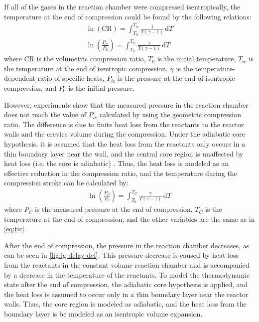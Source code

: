 \documentclass[../main.tex]{subfiles}
\begin{document}
If all of the gases in the reaction chamber were compressed isentropically,
the temperature at the end of compression could be found by the
following relations:
%
\begin{subequations}
\label{eq:tic}
\begin{align}
\ln\left(\text{CR}\right) = \int_{T_0}^{T_{ic}} \! \frac{1}{T\left(\gamma-1\right)} \, \mathrm{d} T \\
\ln\left(\frac{P_{ic}}{P_0}\right) = \int_{T_0}^{T_{ic}} \! \frac{\gamma}{T\left(\gamma-1\right)} \, \mathrm{d} T
\end{align}
\end{subequations}
%
where CR is the volumetric compression ratio, $T_0$ is the initial temperature,
$T_{ic}$ is the temperature at the end of isentropic compression, $\gamma$ is the
temperature-dependent ratio of specific heats, $P_{ic}$ is the pressure at the
end of isentropic compression, and $P_0$ is the initial pressure.

However, experiments show that the measured pressure in the reaction chamber
does not reach the value of $P_{ic}$ calculated by using the geometric
compression ratio. The difference is due to finite heat loss from the
reactants to the reactor walls and the crevice volume during the
compression. Under the adiabatic core hypothesis, it is assumed that
the heat loss from the reactants only occurs in a thin boundary layer
near the wall, and the central core region is unaffected by heat loss
(i.e. the core is adiabatic) \cite{Desgroux1995}. Thus, the heat
loss is modeled as an effective reduction in the compression ratio, and
the temperature during the compression stroke can be calculated by:
%
\begin{align}
\ln\left(\frac{P_{C}}{P_0}\right) = \int_{T_0}^{T_{C}} \! \frac{\gamma}{T\left(\gamma-1\right)} \, \mathrm{d} T
\label{eq:tc}
\end{align}
%
where $P_C$ is the measured pressure at the end of compression, $T_C$
is the temperature at the end of compression, and the other variables
are the same as in \cref{eq:tic}.

After the end of compression, the pressure in the reaction chamber
decreases, as can be seen in \cref{fig:ig-delay-def}. This pressure
decrease is caused by heat loss from the reactants in the constant volume reaction
chamber and is accompanied by a decrease in the temperature of the
reactants. To model the thermodynamic state after the end of compression,
the adiabatic core hypothesis is applied, and the heat loss is
assumed to occur only in a thin boundary layer near the reactor walls.
Thus, the core region is modeled as adiabatic, and the heat loss
from the boundary layer is be modeled as an isentropic volume
expansion.
\end{document}
